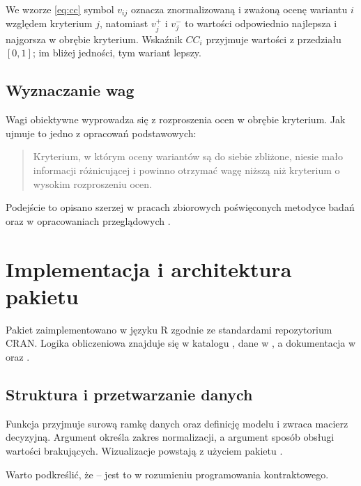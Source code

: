 \documentclass[stronyinfo]{epi-praca}
\begin{document}
We wzorze \eqref{eq:cc} symbol $v_{ij}$ oznacza znormalizowaną i zważoną ocenę wariantu $i$ względem kryterium $j$, natomiast $v_j^{+}$ i $v_j^{-}$ to wartości odpowiednio najlepsza i najgorsza w obrębie kryterium. Wskaźnik $CC_i$ przyjmuje wartości z przedziału $[0, 1]$; im bliżej jedności, tym wariant lepszy.

\section{Wyznaczanie wag}

Wagi obiektywne wyprowadza się z rozproszenia ocen w obrębie kryterium. Jak ujmuje to jedno z opracowań podstawowych:

\begin{quote}
Kryterium, w którym oceny wariantów są do siebie zbliżone, niesie mało informacji różnicującej i powinno otrzymać wagę niższą niż kryterium o wysokim rozproszeniu ocen.
\end{quote}

Podejście to opisano szerzej w pracach zbiorowych poświęconych metodyce badań \parencite{kowalski1998red} oraz w opracowaniach przeglądowych \parencite{nowak1999wielu,nowakp1999}.

\chapter{Implementacja i architektura pakietu}

Pakiet zaimplementowano w języku R zgodnie ze standardami repozytorium CRAN. Logika obliczeniowa znajduje się w katalogu , dane w , a dokumentacja w  oraz .

\section{Struktura i przetwarzanie danych}

Funkcja  przyjmuje surową ramkę danych oraz definicję modelu i zwraca macierz decyzyjną. Argument  określa zakres normalizacji, a argument  sposób obsługi wartości brakujących. Wizualizacje powstają z użyciem pakietu .

Warto podkreślić, że  -- jest to  w rozumieniu programowania kontraktowego.
\end{document}
